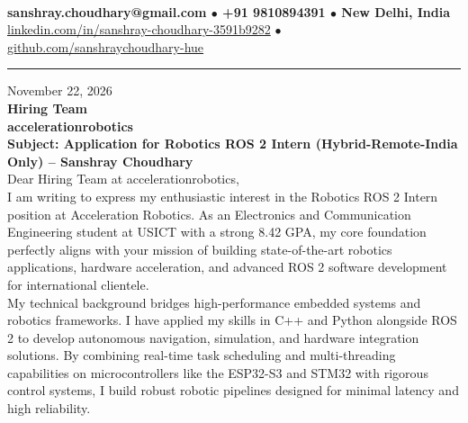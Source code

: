\documentclass[10pt,a4paper]{article}%
\begin{document}
%
 \vspace{3pt}\\%
\noindent \textbf{\footnotesize sanshray.choudhary@gmail.com $\bullet$ +91 9810894391 $\bullet$ New Delhi, India}\\%
\noindent \href{https://www.linkedin.com/in/sanshray-choudhary-3591b9282}{linkedin.com/in/sanshray-choudhary-3591b9282} $\bullet$ \href{https://github.com/sanshraychoudhary-hue}{github.com/sanshraychoudhary-hue} \vspace{12pt}%
\hrule \vspace{18pt}%

\noindent November 22, 2026 \vspace{12pt}\\%
\noindent \textbf{Hiring Team} \\%
\noindent \textbf{accelerationrobotics} \vspace{16pt}\\%

\noindent \textbf{Subject: Application for Robotics ROS 2 Intern (Hybrid-Remote-India Only) -- Sanshray Choudhary} \vspace{12pt}\\%

\noindent Dear Hiring Team at accelerationrobotics, \vspace{8pt}\\%

\noindent I am writing to express my enthusiastic interest in the Robotics ROS 2 Intern position at Acceleration Robotics. As an Electronics and Communication Engineering student at USICT with a strong 8.42 GPA, my core foundation perfectly aligns with your mission of building state-of-the-art robotics applications, hardware acceleration, and advanced ROS 2 software development for international clientele. \vspace{8pt}\\

\noindent My technical background bridges high-performance embedded systems and robotics frameworks. I have applied my skills in C++ and Python alongside ROS 2 to develop autonomous navigation, simulation, and hardware integration solutions. By combining real-time task scheduling and multi-threading capabilities on microcontrollers like the ESP32-S3 and STM32 with rigorous control systems, I build robust robotic pipelines designed for minimal latency and high reliability. \vspace{8pt}\\
\end{document}
